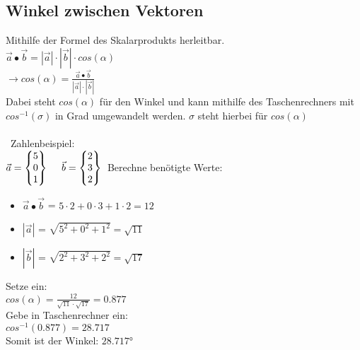 \subsection{Winkel zwischen Vektoren}
Mithilfe der Formel des Skalarprodukts herleitbar. \\
$\vec{a} \bullet \vec{b} = |\vec{a}| \cdot |\vec{b}| \cdot cos(\alpha)$ \\
$\rightarrow cos(\alpha) = \frac{\vec{a}\bullet \vec{b}}{|\vec{a}|\cdot |\vec{b}|}$ \\
Dabei steht $cos(\alpha)$ für den Winkel und kann mithilfe des Taschenrechners mit $cos^{-1}(\sigma)$ in Grad umgewandelt werden. 
$\sigma$ steht hierbei für $cos(\alpha)$ \\\\
\
Zahlenbeispiel: \\
$
\vec{a} = 
\begin{Bmatrix}
    5 \\ 0 \\ 1
\end{Bmatrix} 
\ \ \ \
\vec{b} = 
\begin{Bmatrix}
    2 \\ 3 \\ 2
\end{Bmatrix} \\
$
Berechne benötigte Werte:
\begin{itemize}
    \item $\vec{a} \bullet \vec{b}$ = $5 \cdot 2 + 0 \cdot 3 + 1 \cdot 2 = 12$
    \item $|\vec{a}|$ = $\sqrt{5^2 + 0^2 + 1^2} = \sqrt{11}$
    \item $|\vec{b}|$ = $\sqrt{2^2 + 3^2 + 2^2} = \sqrt{17}$
\end{itemize}
Setze ein: \\
$cos(\alpha) = \frac{12}{\sqrt{11}\cdot \sqrt{17}} = 0.877$ \\
Gebe in Taschenrechner ein: \\
$cos^{-1}(0.877) = 28.717$ \\
Somit ist der Winkel: $28.717$°
